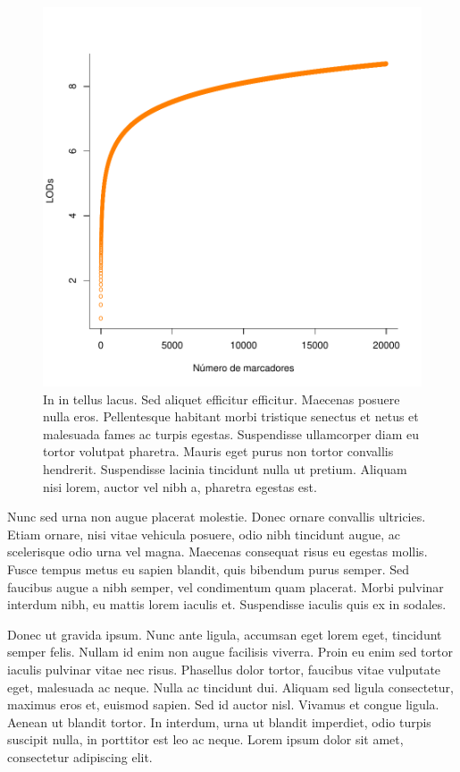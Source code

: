 \begin{btUnit}
\begin{figure}[htb]
  \centering
  \includegraphics[scale=0.35]{figuras/graphical_model.pdf}
  \caption{In in tellus lacus. Sed aliquet efficitur efficitur.
    Maecenas posuere nulla eros. Pellentesque habitant morbi tristique
    senectus et netus et malesuada fames ac turpis egestas.
    Suspendisse ullamcorper diam eu tortor volutpat pharetra. Mauris
    eget purus non tortor convallis hendrerit. Suspendisse lacinia
    tincidunt nulla ut pretium. Aliquam nisi lorem, auctor vel nibh a,
    pharetra egestas est.}
  \label{fig:12}
\end{figure}

Nunc sed urna non augue placerat molestie. Donec ornare convallis
ultricies. Etiam ornare, nisi vitae vehicula posuere, odio nibh
tincidunt augue, ac scelerisque odio urna vel magna. Maecenas
consequat risus eu egestas mollis. Fusce tempus metus eu sapien
blandit, quis bibendum purus semper. Sed faucibus augue a nibh semper,
vel condimentum quam placerat. Morbi pulvinar interdum nibh, eu mattis
lorem iaculis et. Suspendisse iaculis quis ex in sodales.

Donec ut gravida ipsum. Nunc ante ligula, accumsan eget lorem eget,
tincidunt semper felis. Nullam id enim non augue facilisis viverra.
Proin eu enim sed tortor iaculis pulvinar vitae nec risus. Phasellus
dolor tortor, faucibus vitae vulputate eget, malesuada ac neque. Nulla
ac tincidunt dui. Aliquam sed ligula consectetur, maximus eros et,
euismod sapien. Sed id auctor nisl. Vivamus et congue ligula. Aenean
ut blandit tortor. In interdum, urna ut blandit imperdiet, odio turpis
suscipit nulla, in porttitor est leo ac neque. Lorem ipsum dolor sit
amet, consectetur adipiscing elit.


\end{btUnit}

